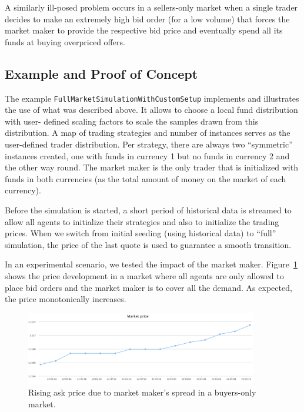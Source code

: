 A similarly ill-posed problem occurs in a sellers-only market when a single trader
decides to make an extremely high bid order (for a low volume) that forces the market
maker to provide the respective bid price and eventually spend all its funds at buying
overpriced offers.

\subsection{Example and Proof of Concept}
The example \texttt{FullMarketSimulationWithCustomSetup} implements and illustrates the
use of what was described above. It allows to choose a local fund distribution with user-
defined scaling factors to scale the samples drawn from this distribution. A map of trading
strategies and number of instances serves as the user-defined trader distribution.
Per strategy, there are always two ``symmetric'' instances created, one with funds in
currency 1 but no funds in currency 2 and the other way round.
The market maker is the only trader that is initialized with funds in both currencies
(as the total amount of money on the market of each currency).

Before the simulation is started, a short period of historical data is streamed to allow
all agents to initialize their strategies and also to initialize the trading prices.
When we switch from initial seeding (using historical data) to ``full'' simulation,
the price of the last quote is used to guarantee a smooth transition.

In an experimental scenario, we tested the impact of the market maker.
Figure~\ref{fig:mm-sells} shows the price development in a market where all agents are
only allowed to place bid orders and the market maker is to cover all the demand.
As expected, the price monotonically increases.

\begin{figure}[h]
  \center
  \includegraphics[width=0.9\textwidth]{img/examples/simulation-mad-buys-mm-sells.png}
  \caption{Rising ask price due to market maker's spread in a buyers-only market.}
  \label{fig:mm-sells}
\end{figure}

